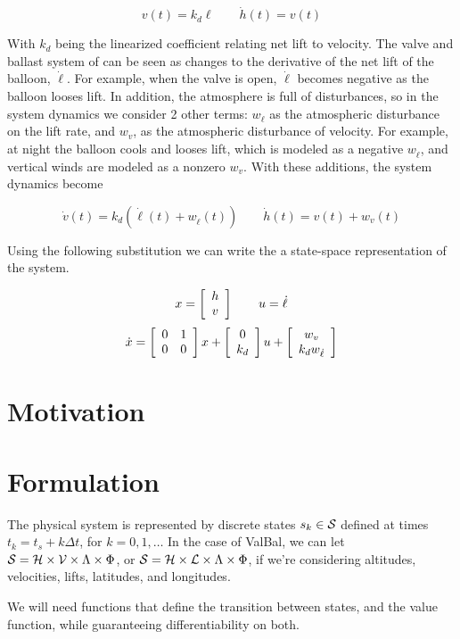 \documentclass[11pt]{scrartcl} %
\begin{document}
\[ v(t) = k_d \ell \qquad \dot h(t) = v(t)\]

With $k_d$ being the linearized coefficient relating net lift to velocity. The valve and ballast system of can be seen as changes to the derivative of the net lift of the balloon, $\dot \ell$. For example, when the valve is open, $\dot \ell$ becomes negative as the balloon looses lift. In addition, the atmosphere is full of disturbances, so in the system dynamics we consider 2 other terms: $w_{\dot \ell}$ as the atmospheric disturbance on the lift rate, and $w_v$, as the atmospheric disturbance of velocity. For example, at night the balloon cools and looses lift, which is modeled as a negative $w_{\dot \ell}$, and vertical winds are modeled as a nonzero $w_v$. With these additions, the system dynamics become

\[ \dot v(t) = k_d(\dot \ell(t) + w_{\dot \ell}(t)) \qquad \dot h(t) = v(t) + w_v(t) \]

Using the following substitution we can write the a state-space representation of the system. 

\[x = \mx{c}{h \\ v} \qquad u = \dot \ell\]
\[\dot x = \mx{cc}{0 & 1 \\ 0 & 0}x + \mx{cc}{0 \\ k_d} u + \mx{c}{w_v \\ k_d w_{\dot \ell}}\]




\section{Motivation}

\section{Formulation}
The physical system is represented by discrete states $s_k\in\States$ defined at times $t_k=t_s + k \Delta t$, for $k=0,1,\dots$ In the case of ValBal, we can let $\States=\Altitudes\times\Velocities\times\Lambda\times\Phi$, or $\States=\Altitudes\times\Lifts\times\Lambda\times\Phi$, if we're considering altitudes, velocities, lifts, latitudes, and longitudes.

We will need functions that define the transition between states, and the value function, while guaranteeing differentiability on both. 
\end{document}
